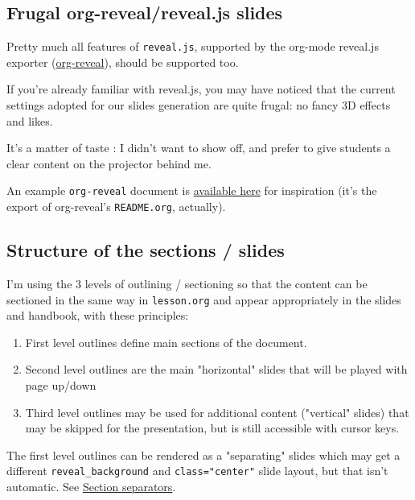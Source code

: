 \documentclass[a4paper]{article}
\newenvironment{NOTES}{\begin{lrbox}{\mybox}\begin{minipage}{0.9\textwidth}\begin{shaded}}{\end{shaded}\end{minipage}\end{lrbox}\fbox{\usebox{\mybox}}}
\begin{document}
\subsection{Frugal org-reveal/reveal.js slides}
\label{sec:org7edaf2a}

Pretty much all features of \texttt{reveal.js}, supported by the org-mode reveal.js exporter (\href{https://github.com/yjwen/org-reveal/}{org-reveal}), should be supported too.

If you're already familiar with reveal.js, you may have noticed that
the current settings adopted for our slides generation are quite
frugal: no fancy 3D effects and likes.


\begin{NOTES}
It's a matter of taste : I didn't want to show off, and prefer to give
students a clear content on the projector behind me.

An example \texttt{org-reveal} document is \href{elisp/org-reveal/Readme.html}{available here} for inspiration (it's the export of org-reveal's \texttt{README.org}, actually).
\end{NOTES}

\subsection{Structure of the sections / slides}
\label{sec:org01f3b28}

I'm using the 3 levels of outlining / sectioning so that the content can be sectioned in the same way in \texttt{lesson.org} and appear appropriately in the slides and handbook, with these principles:

\begin{enumerate}
\item First level outlines define main sections of the document.
\item Second level outlines are the main "horizontal" slides that will be played with page up/down
\item Third level outlines may be used for additional content ("vertical" slides) that may be skipped for the presentation, but is still accessible with cursor keys.
\end{enumerate}

\begin{NOTES}
The first level outlines can be rendered as a "separating" slides which may get a different \texttt{reveal\_background} and \texttt{class="center"} slide layout, but that isn't automatic. See \hyperref[sec:org836384e]{Section separators}.
\end{NOTES}
\end{document}
